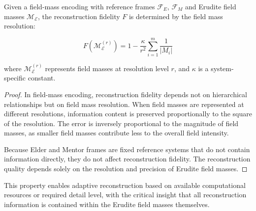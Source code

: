 \begin{proposition}
Given a field-mass encoding with reference frames $\mathcal{F}_E$, $\mathcal{F}_M$ and Erudite field masses $\mathcal{M}_\mathcal{E}$, the reconstruction fidelity $F$ is determined by the field mass resolution:

\begin{equation}
F(\mathcal{M}_\mathcal{E}^{(r)}) = 1 - \frac{\kappa}{r^2} \sum_{i=1}^m \frac{1}{|M_i|}
\end{equation}

where $\mathcal{M}_\mathcal{E}^{(r)}$ represents field masses at resolution level $r$, and $\kappa$ is a system-specific constant.
\end{proposition}

\begin{proof}
In field-mass encoding, reconstruction fidelity depends not on hierarchical relationships but on field mass resolution. When field masses are represented at different resolutions, information content is preserved proportionally to the square of the resolution. The error is inversely proportional to the magnitude of field masses, as smaller field masses contribute less to the overall field intensity.

Because Elder and Mentor frames are fixed reference systems that do not contain information directly, they do not affect reconstruction fidelity. The reconstruction quality depends solely on the resolution and precision of Erudite field masses.
\end{proof}

This property enables adaptive reconstruction based on available computational resources or required detail level, with the critical insight that all reconstruction information is contained within the Erudite field masses themselves.

